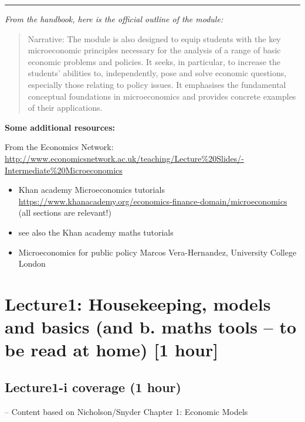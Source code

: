 \documentclass[]{article}
\begin{document}
\begin{center}\rule{0.5\linewidth}{\linethickness}\end{center}

\emph{From the handbook, here is the official outline of the module:}

\begin{quote}
Narrative: The module is also designed to equip students with the key
microeconomic principles necessary for the analysis of a range of basic
economic problems and policies. It seeks, in particular, to increase the
students' abilities to, independently, pose and solve economic
questions, especially those relating to policy issues. It emphasises the
fundamental conceptual foundations in microeconomics and provides
concrete examples of their applications.
\end{quote}

\textbf{Some additional resources:}

From the Economics Network:
\url{http://www.economicsnetwork.ac.uk/teaching/Lecture\%20Slides/-Intermediate\%20Microeconomics}

\begin{itemize}
\item
  Khan academy Microeconomics tutorials
  \url{https://www.khanacademy.org/economics-finance-domain/microeconomics}
  (all sections are relevant!)
\item
  see also the Khan academy maths tutorials
\item
  Microeconomics for public policy Marcos Vera-Hernandez, University
  College London
\end{itemize}

\hypertarget{lecture1-housekeeping-models-and-basics-and-b.-maths-tools-to-be-read-at-home-1-hour}{%
\section{Lecture1: Housekeeping, models and basics (and b. maths tools
-- to be read at home) {[}1
hour{]}}\label{lecture1-housekeeping-models-and-basics-and-b.-maths-tools-to-be-read-at-home-1-hour}}

\hypertarget{lecture1-i-coverage-1-hour}{%
\subsection{Lecture1-i coverage (1
hour)}\label{lecture1-i-coverage-1-hour}}

-- Content based on Nicholson/Snyder Chapter 1: Economic Models
\end{document}
